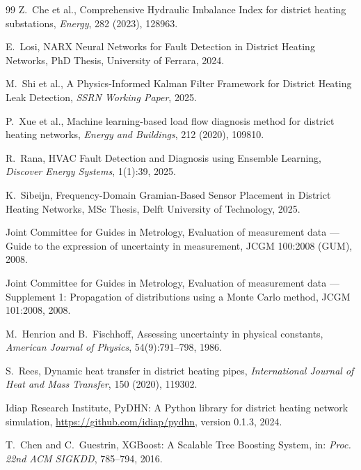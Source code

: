 \documentclass[11pt,a4paper]{ctexart}
\begin{document}
\begin{thebibliography}{99}
Z.~Che et al.,
\newblock Comprehensive Hydraulic Imbalance Index for district heating substations,
\newblock \emph{Energy}, 282 (2023), 128963.

E.~Losi,
\newblock NARX Neural Networks for Fault Detection in District Heating Networks,
\newblock PhD Thesis, University of Ferrara, 2024.

M.~Shi et al.,
\newblock A Physics-Informed Kalman Filter Framework for District Heating Leak Detection,
\newblock \emph{SSRN Working Paper}, 2025.

P.~Xue et al.,
\newblock Machine learning-based load flow diagnosis method for district heating networks,
\newblock \emph{Energy and Buildings}, 212 (2020), 109810.

R.~Rana,
\newblock HVAC Fault Detection and Diagnosis using Ensemble Learning,
\newblock \emph{Discover Energy Systems}, 1(1):39, 2025.

K.~Sibeijn,
\newblock Frequency-Domain Gramian-Based Sensor Placement in District Heating Networks,
\newblock MSc Thesis, Delft University of Technology, 2025.

Joint Committee for Guides in Metrology,
\newblock Evaluation of measurement data --- Guide to the expression of uncertainty in measurement,
\newblock JCGM 100:2008 (GUM), 2008.

Joint Committee for Guides in Metrology,
\newblock Evaluation of measurement data --- Supplement 1: Propagation of distributions using a Monte Carlo method,
\newblock JCGM 101:2008, 2008.

M.~Henrion and B.~Fischhoff,
\newblock Assessing uncertainty in physical constants,
\newblock \emph{American Journal of Physics}, 54(9):791--798, 1986.

S.~Rees,
\newblock Dynamic heat transfer in district heating pipes,
\newblock \emph{International Journal of Heat and Mass Transfer}, 150 (2020), 119302.

Idiap Research Institute,
\newblock PyDHN: A Python library for district heating network simulation,
\newblock \url{https://github.com/idiap/pydhn}, version 0.1.3, 2024.

T.~Chen and C.~Guestrin,
\newblock XGBoost: A Scalable Tree Boosting System,
\newblock in: \emph{Proc. 22nd ACM SIGKDD}, 785--794, 2016.


\end{thebibliography}
\end{document}
